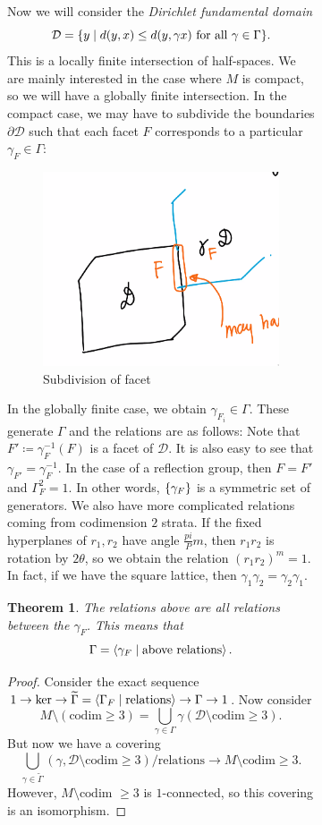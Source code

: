 \documentclass[leqno, openany]{memoir}
\newtheorem{thm}{Theorem}[section]
\theoremstyle{definition}
\theoremstyle{remark}
\theoremstyle{plain}
\theoremstyle{definition}
\theoremstyle{remark}
\newcommand{\mc}[1]{\mathcal{#1}}
\newcommand{\wtl}[1]{\widetilde{#1}}
\begin{document}
\begin{figure}[H]
\begin{figure}[H]
Now we will consider the \textit{Dirichlet fundamental domain} \[ \mc{D} =
\qty{y \mid d(y,x) \leq d(y, \gamma x) \text{ for all } \gamma \in \Gamma}. \]
This is a locally finite intersection of half-spaces. We are mainly interested
in the case where $M$ is compact, so we will have a globally finite
intersection. In the compact case, we may have to subdivide the boundaries
$\partial \mc{D}$ such that each facet $F$ corresponds to a particular
$\gamma_F \in \Gamma$: \begin{figure}[H] \centering
    \includegraphics[scale=0.5]{fd_domain.png} \caption{Subdivision of facet}%
\label{fig:fd_domain} \end{figure} In the globally finite case, we obtain
$\gamma_{F_i} \in \Gamma$. These generate $\Gamma$ and the relations are as
follows: Note that $F' \coloneqq \gamma_F^{-1}(F)$ is a facet of $\mc{D}$. It
is also easy to see that $\gamma_{F'} = \gamma_F^{-1}$. In the case of a
reflection group, then $F = F'$ and $\Gamma_F^2 = 1$. In other words,
$\qty{\gamma_F}$ is a symmetric set of generators. We also have more
complicated relations coming from codimension $2$ strata. If the fixed
hyperplanes of $r_1, r_2$ have angle $\frac{pi}Pm$, then $r_1 r_2$ is rotation
by $2 \theta$, so we obtain the relation ${(r_1 r_2)}^m = 1$. In fact, if we
have the square lattice, then $\gamma_1 \gamma_2 = \gamma_2 \gamma_1$.

\begin{thm} The relations above are all relations between the $\gamma_F$. This
    means that \[ \Gamma = \ev{\gamma_F \mid \text{above relations}}. \]
\end{thm}

\begin{proof} Consider the exact sequence $1 \to \ker \to \wtl{\Gamma} =
    \ev{\Gamma_F \mid \text{relations}} \to \Gamma \to 1$. Now consider \[ M
    \setminus ( \text{codim}\geq 3 ) = \bigcup_{\gamma \in \Gamma}
\gamma(\mc{D} \setminus \text{codim} \geq 3). \] But now we have a covering \[
\bigcup_{\gamma \in \wtl{\Gamma}} (\gamma, \mc{D} \setminus \text{codim}\geq 3)
/ \text{relations} \to M \setminus \text{codim}\geq 3. \] However, $M \setminus
\text{codim }\geq 3$ is $1$-connected, so this covering is an isomorphism.
\end{proof}


\end{figure}
\end{figure}
\end{document}
